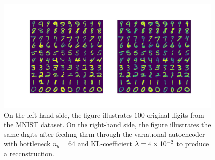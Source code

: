 \begin{figure}
\begin{center}
      \includegraphics[trim = 15mm 10mm 15mm 15mm, clip, width=\linewidth]{convolutional_VAE_snd_KL_4e-2_10k_epochs_64D_inference}
\end{center}
\caption{On the left-hand side, the figure illustrates $100$ original digits from the MNIST dataset. On the right-hand side, the figure illustrates the same digits after feeding them through the variational autoencoder with bottleneck $n_b=64$ and KL-coefficient $\lambda=\num{4e-2}$ to produce a reconstruction.}\label{fig:convolutional_VAE_snd_KL_4e-2_10k_epochs_64D_inference}
\end{figure}


